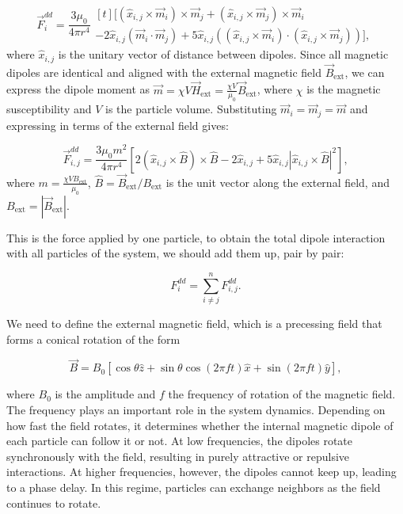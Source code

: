\begin{equation}
  \label{eq:dipoledipoleforce}
\vec{F}^{dd}_i = \frac{3\mu_0}{4\pi r^4}
\begin{multlined}[t]
\bigl[ (\hat{x}_{i,j} \times \vec{m}_i) \times \vec{m}_j
    + (\hat{x}_{i,j} \times \vec{m}_j) \times \vec{m}_i \\
    - 2\hat{x}_{i,j}(\vec{m}_i \cdot \vec{m}_j)
    + 5\hat{x}_{i,j}((\hat{x}_{i,j} \times \vec{m}_i) \cdot (\hat{x}_{i,j} \times \vec{m}_j)) \bigr],
\end{multlined}
\end{equation}
where $\hat{x}_{i,j}$ is the unitary vector of distance between dipoles. Since all magnetic dipoles are identical and aligned with the external magnetic field $\vec{B}_{\text{ext}}$, we can express the dipole moment as $\vec{m} = \chi V \vec{H}_{\text{ext}} = \frac{\chi V}{\mu_0} \vec{B}_{\text{ext}}$, where $\chi$ is the magnetic susceptibility and $V$ is the particle volume. Substituting $\vec{m}_i = \vec{m}_j = \vec{m}$ and expressing in terms of the external field gives:

\begin{equation}
  \label{eq:dipoledipoleforce_Bext}
  \vec{F}^{dd}_{i,j} = \frac{3\mu_0 m^2}{4\pi r^4}
\left[ 2(\hat{x}_{i,j} \times \hat{B}) \times \hat{B} - 2\hat{x}_{i,j} + 5\hat{x}_{i,j}|\hat{x}_{i,j} \times \hat{B}|^2 \right],
\end{equation}
where $m = \frac{\chi V B_{\text{ext}}}{\mu_0}$, $\hat{B} = \vec{B}_{\text{ext}}/B_{\text{ext}}$ is the unit vector along the external field, and $B_{\text{ext}} = |\vec{B}_{\text{ext}}|$. 

This is the force applied by one particle, to obtain the total dipole interaction with all particles of the system, we should add them up, pair by pair:

\begin{equation}
  F^{dd}_i = \sum^{n}_{i \neq j} F^{dd}_{i,j}.  
  \label{eq:dipolesum}
\end{equation}

We need to define the external magnetic field, which is a precessing field that forms a conical rotation of the form

\begin{equation}
  \vec{B} = B_0 [\cos{\theta}\hat{z} + \sin{\theta}\cos{(2\pi f t)}\hat{x} + \sin{(2\pi f t)}\hat{y}],
  \label{eq:magneticfield}
\end{equation}


where $B_0$ is the amplitude and $f$ the frequency of rotation of the magnetic field. The frequency plays an important role in the system dynamics. Depending on how fast the field rotates, it determines whether the internal magnetic dipole of each particle can follow it or not. At low frequencies, the dipoles rotate synchronously with the field, resulting in purely attractive or repulsive interactions. At higher frequencies, however, the dipoles cannot keep up, leading to a phase delay. In this regime, particles can exchange neighbors as the field continues to rotate.



